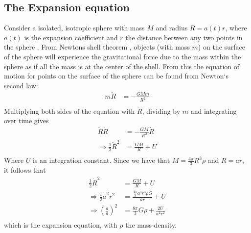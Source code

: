 \documentclass[a4paper, 11pt]{FSKH_623_Report}
\numberwithin{equation}{section}
\begin{document}
\subsection*{The Expansion equation}
Consider a isolated, isotropic sphere with mass $M$ and radius $R=a(t)r$, where $a(t)$ is the expansion coefficient and $r$ the distance between any two points in the sphere \citep{notes4}. From Newtons shell theorem \citep{IronShell}, objects (with mass $m$) on the surface of the sphere will experience the gravitational force due to the mass within the sphere as if all the mass is at the center of the shell. From this the equation of motion for points on the surface of the sphere can be found from Newton`s second law:
\begin{equation}
\begin{split}
m\ddot{R} &= -\frac{GMm}{R^{2}}\\
\end{split}
\end{equation}
Multiplying both sides of the equation with $\dot{R}$, dividing by $m$ and integrating over time gives
\begin{equation}
\begin{split}
\ddot{R}\dot{R} &= -\frac{GM}{R^{2}}\dot{R}\\
\Rightarrow\frac{1}{2}\dot{R}^2 &= \frac{GM}{R}+U\\
\end{split}
\end{equation}
Where $U$ is an integration constant. Since we have that $M=\frac{4\pi}{3}R^{3}\rho$ and $R=ar$, it follows that
\begin{equation}
\begin{split}
\frac{1}{2}\dot{R}^2 &= \frac{GM}{R}+U\\
\Rightarrow\frac{1}{2}\dot{a}^{2}r^{2} &= \frac{\frac{4\pi}{3}a^{3}r^{3}\rho G}{ar}+U\\
\Rightarrow\left(\frac{\dot{a}}{a}\right)^{2} &= \frac{8\pi}{3}G\rho+\frac{2U}{a^{2}r^{2}}\\
\end{split}
\end{equation}
which is the expansion equation, with $\rho$ the mass-density.
\pagebreak
\end{document}
